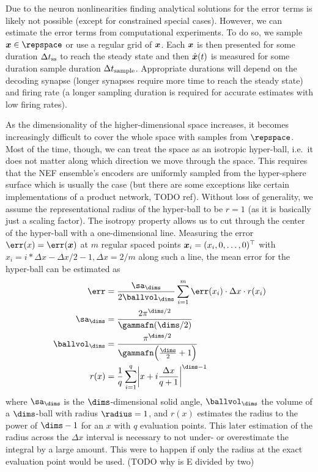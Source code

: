 Due to the neuron nonlinearities finding analytical solutions for the error terms is likely not possible (except for constrained special cases).
However, we can estimate the error terms from computational experiments.
To do so, we sample $\vc x \in \repspace$ or use a regular grid of $\bm{x}$.
Each $\bm{x}$ is then presented for some duration $\Delta t_{{\mathrm{ss}}}$ to reach the steady state and then $\hat{\bm{x}}(t)$ is measured for some duration sample duration $\Delta t_{{\mathrm{sample}}}$.
Appropriate durations will depend on the decoding synapse (longer synapses require more time to reach the steady state) and firing rate (a longer sampling duration is required for accurate estimates with low firing rates).

As the dimensionality of the higher-dimensional space increases, it becomes increasingly difficult to cover the whole space with samples from $\repspace$.
Most of the time, though, we can treat the space as an isotropic hyper-ball, i.e.\ it does not matter along which direction we move through the space.
This requires that the NEF ensemble's encoders are uniformly sampled from the hyper-sphere surface which is usually the case (but there are some exceptions like certain implementations of a product network, TODO ref).
Without loss of generality, we assume the representational radius of the hyper-ball to be $r = 1$ (as it is basically just a scaling factor).
The isotropy property allows us to cut through the center of the hyper-ball with a one-dimensional line.
Measuring the error $\err(x) = \err(\vc x)$ at $m$ regular spaced points $\bm{x}_i = (x_i, 0, \dotsc, 0)^{\top}$ with $x_i = i * \Delta x - \Delta x/2 - 1, \Delta x = 2/m$ along such a line, the mean error for the hyper-ball can be estimated as
\begin{align}
    \err &= \frac{\sa_{\dims}}{2\ballvol_{\dims}} \sum_{i=1}^{m} \err(x_i) \cdot \Delta x \cdot r(x_i) \\
    \sa_{\dims} &= \frac{2 \pi^{\dims/2}}{\gammafn(\dims/2)} \\
    \ballvol_{\dims} &= \frac{\pi^{\dims/2}}{\gammafn\!\del{\frac{\dims}{2} + 1}} \\
    r(x) &= \frac{1}{q} \sum_{i=1}^{q} \abs{x + i \frac{\Delta x}{q + 1}}^{\dims - 1}
\end{align}
where $\sa_{\dims}$ is the $\dims$-dimensional solid angle, $\ballvol_{\dims}$ the volume of a $\dims$-ball with radius $\radius = 1$, and $r(x)$ estimates the radius to the power of $\dims-1$ for an $x$ with $q$ evaluation points.
This later estimation of the radius across the $\Delta x$ interval is necessary to not under- or overestimate the integral by a large amount.
This were to happen if only the radius at the exact evaluation point would be used. (TODO why is E divided by two)


